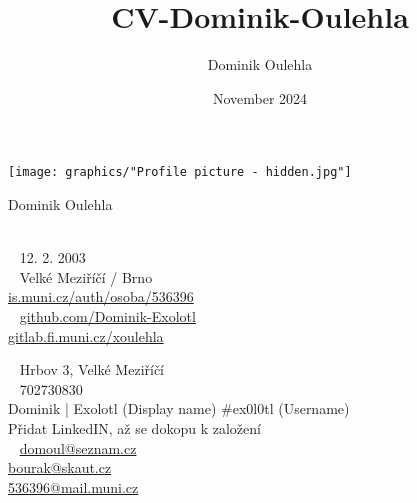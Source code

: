 \documentclass{modernsimplecv}
\title{CV-Dominik-Oulehla}
\author{Dominik Oulehla}
\date{November 2024}
\begin{document}
\thispagestyle{empty}




\begin{minipage}[t]{0.21\textwidth}
\vspace{0pt} %
\texttt{[image: graphics/"Profile picture - hidden.jpg"]}\hspace{1em}
\end{minipage}
\hfill
\begin{minipage}[t]{0.77\textwidth}
\vspace{0pt} %
\begin{shaded*}

\begin{minipage}[t]{0.4\textwidth}
\vspace{0pt} %
{\par\centering\huge\textsf{Dominik Oulehla}} \\[0.3cm]
\faBirthdayCake~ 12. 2. 2003 \\
\faMapMarker~ Velké Meziříčí / Brno \\

{\small
 \protect\url{is.muni.cz/auth/osoba/536396} \\
\faGithub~ \protect\url{github.com/Dominik-Exolotl} \\
 \protect\url{gitlab.fi.muni.cz/xoulehla}
}
\end{minipage}\hfill
\begin{minipage}[t]{0.55\textwidth}
\vspace{0pt}
\faEnvelopeO~ Hrbov 3, Velké Meziříčí \\
\faPhone~ 702730830 \\
 Dominik | Exolotl \tiny{(Display name)}\normalsize{ \#ex0l0tl} \tiny{(Username)} \normalsize\\
 \small{Přidat LinkedIN, až se dokopu k založení} \normalsize \\[0.175cm]

\large
\faAt~ \protect\url{domoul@seznam.cz}\\
 \protect\url{bourak@skaut.cz} \\
 \protect\url{536396@mail.muni.cz} \normalsize\\
\end{minipage}
\hfill
\end{shaded*}
\end{minipage}\\[15pt]
\end{document}
